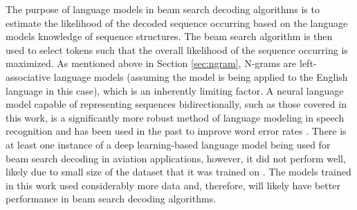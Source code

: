 \documentclass[12pt]{article}
\begin{document}
The purpose of language models in beam search decoding algorithms is to estimate the likelihood of the decoded sequence occurring based on the
language models knowledge of sequence structures. The beam search algorithm is then used to select tokens such that the overall likelihood of the
sequence occurring is maximized. As mentioned above in Section \ref{sec:ngram}, N-grams are left-associative language models (assuming the model is
being applied to the English language in this case), which is an inherently limiting factor. A neural language model capable of representing
sequences bidirectionally, such as those covered in this work, is a significantly more robust method of language modeling in speech recognition and
has been used in the past to improve word error rates \cite{kriman_quartznet_2020,majumdar_citrinet_2021}. There is at least one instance of a deep
learning-based language model being used for beam search decoding in aviation applications, however, it did not perform well, likely due to small
size of the dataset that it was trained on \cite{pellegrini_airbus_2019}. The models trained in this work used considerably more data and, therefore,
will likely have better performance in beam search decoding algorithms.

\newpage


\end{document}
